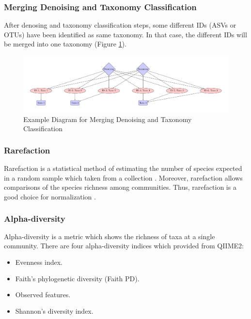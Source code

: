 \documentclass[a4paper]{article}
\begin{document}
            \subsubsection{Merging Denoising and Taxonomy Classification}
                After denosing and taxonomy classification steps, some different IDs (ASVs or OTUs) have been identified as same taxonomy. In that case, the different IDs will be merged into one taxonomy (Figure \ref{fig:merging}).

                \begin{figure}[p]
                    \centering
                    \includegraphics[width=0.8 \linewidth]{figures/Merging/merging.pdf}
                    \caption{Example Diagram for Merging Denoising and Taxonomy Classification}
                    \label{fig:merging}
                \end{figure}

            \subsubsection{Rarefaction}
                Rarefaction is a statistical method of estimating the number of species expected in a random sample which taken from a collection \cite{rarefaction1}. Moreover, rarefaction allows comparisons of the species richness among communities. Thus, rarefaction is a good choice for normalization \cite{rarefaction2}.

            \subsubsection{Alpha-diversity}
                Alpha-diversity is a metric which shows the richness of taxa at a single community. There are four alpha-diversity indices which provided from QIIME2:
                \begin{itemize}
                    \item Evenness index.
                    \item Faith's phylogenetic diversity (Faith PD).
                    \item Observed features.
                    \item Shannon's diversity index.
                \end{itemize}
\end{document}
